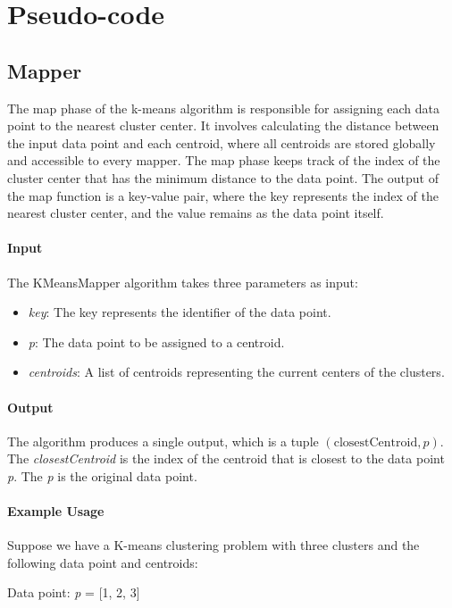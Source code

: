 \documentclass[parskip=full]{report}
\begin{document}
\section{Pseudo-code}

\subsection{Mapper}
The map phase of the k-means algorithm is responsible for assigning each data point to the nearest cluster center. It involves calculating the distance between the input data point and each centroid, where all centroids are stored globally and accessible to every mapper. The map phase keeps track of the index of the cluster center that has the minimum distance to the data point. The output of the map function is a key-value pair, where the key represents the index of the nearest cluster center, and the value remains as the data point itself.

\paragraph{Input}
The KMeansMapper algorithm takes three parameters as input:
\begin{itemize}
	\item \textit{key}: The key represents the identifier of the data point.
	\item \textit{p}: The data point to be assigned to a centroid.
	\item \textit{centroids}: A list of centroids representing the current centers of the clusters.
\end{itemize}


\paragraph{Output}
The algorithm produces a single output, which is a tuple \((\text{closestCentroid}, p)\). The \textit{closestCentroid} is the index of the centroid that is closest to the data point \textit{p}. The \textit{p} is the original data point.

\paragraph{Example Usage}
Suppose we have a K-means clustering problem with three clusters and the following data point and centroids:

Data point: \textit{p} = [1, 2, 3]
\end{document}
